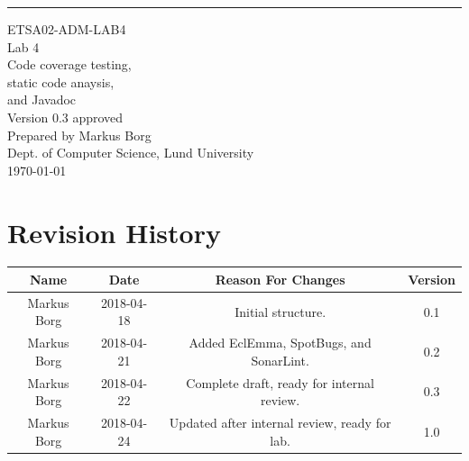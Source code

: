 \documentclass{scrreprt}
\date{}
\def\myversion{0.3 }
\begin{document}
\begin{flushright}
    \rule{16cm}{5pt}\vskip1cm
    \begin{bfseries}
    	\LARGE{ETSA02-ADM-LAB4}\\
    	\vspace{1.5cm}
        \Huge{Lab 4}\\
        \vspace{0.5cm}
        Code coverage testing,\\
        \vspace{0.5cm}
        static code anaysis,\\
        \vspace{0.5cm}
        and Javadoc\\
        \vspace{1.5cm}
        \LARGE{Version \myversion approved}\\
        \vspace{1.5cm}
        Prepared by Markus Borg\\
        Dept. of Computer Science, Lund University\\
        \vspace{1.5cm}
        \today\\
    \end{bfseries}
\end{flushright}


\chapter*{Revision History}

\begin{center}
    \begin{tabular}{|c|c|c|c|}
        \hline
	    Name & Date & Reason For Changes & Version\\
        \hline
	    Markus Borg & 2018-04-18 & Initial structure. & 0.1\\
        \hline
        Markus Borg & 2018-04-21 & Added EclEmma, SpotBugs, and SonarLint. & 0.2\\
        \hline
        Markus Borg & 2018-04-22 & Complete draft, ready for internal review. & 0.3\\
        \hline
        Markus Borg & 2018-04-24 & Updated after internal review, ready for lab. & 1.0\\
        \hline
    \end{tabular}
\end{center}
\end{document}
